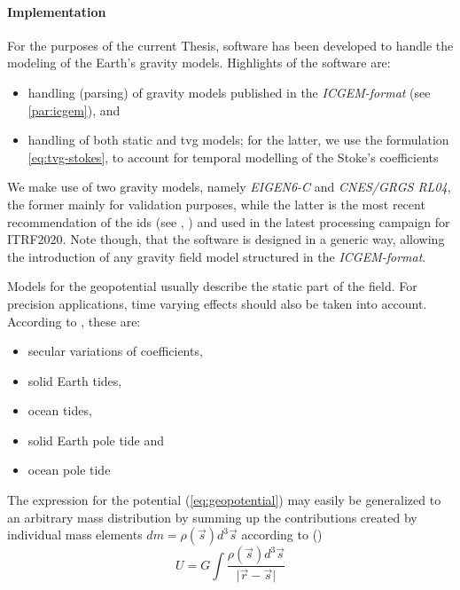 \paragraph{Implementation}\label{par:implementation}
For the purposes of the current Thesis, software has been developed to handle the 
modeling of the Earth's gravity models. Highlights of the software are:
\begin{itemize}
  \item handling (parsing) of gravity models published in the \emph{ICGEM-format} (see \ref{par:icgem}), and
  \item handling of both static and \gls{tvg} models; for the latter, we use the 
    formulation \ref{eq:tvg-stokes}, to account for temporal modelling of the 
    Stoke's coefficients
\end{itemize}

We make use of two gravity models, namely \emph{EIGEN6-C} \cite{Eigen6} and \emph{CNES/GRGS RL04}, 
the former mainly for validation purposes, while the latter is the most recent 
recommendation of the \gls{ids} (see \cite{ids-standards-itrf2020}, \cite{stepanek2022}) 
and used in the latest processing campaign for ITRF2020. Note though, that the software 
is designed in a generic way, allowing the introduction of any gravity field model 
structured in the \emph{ICGEM-format}.

\iffalse
Models for the geopotential usually describe the static part of the field. For 
precision applications, time varying effects should also be taken into account. 
According to \cite{iers2010}, these are:
\begin{itemize}
  \item secular variations of coefficients,
  \item solid Earth tides,
  \item ocean tides,
  \item solid Earth pole tide and
  \item ocean pole tide
\end{itemize}

The expression for the potential (\ref{eq:geopotential}) may easily be 
generalized to an arbitrary mass distribution by summing up the contributions 
created by individual mass elements
\(dm = \rho(\vec{s}) d^3 \vec{s}\) according to (\cite{Montenbruck2000})
\begin{equation}
    U = G \int{\frac{\rho(\vec{s}) d^3 \vec{s}}{\lvert \vec{r} - \vec{s} \rvert}}
\end{equation}

